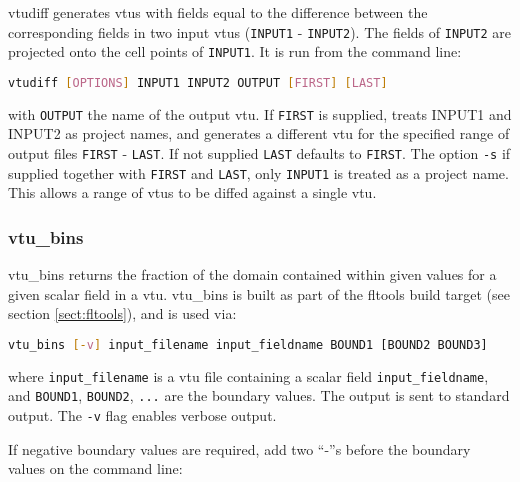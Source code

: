 vtudiff generates vtus with fields equal to the difference between the corresponding fields in two input vtus (\lstinline[language = Bash]+INPUT1+ - \lstinline[language = Bash]+INPUT2+). The fields of \lstinline[language = Bash]+INPUT2+ are projected onto the cell points of \lstinline[language = Bash]+INPUT1+. It is run from the command line:
\begin{lstlisting}[language = Bash]
vtudiff [OPTIONS] INPUT1 INPUT2 OUTPUT [FIRST] [LAST]
\end{lstlisting}
with \lstinline[language = Bash]+OUTPUT+ the name of the output vtu. If \lstinline[language = Bash]+FIRST+ is supplied, treats INPUT1 and INPUT2 as project names, and generates a different vtu for the specified range of output files \lstinline[language = Bash]+FIRST+ - \lstinline[language = Bash]+LAST+. If not supplied \lstinline[language = Bash]+LAST+ defaults to \lstinline[language = Bash]+FIRST+. The option \lstinline[language = Bash]+-s+ if supplied together with \lstinline[language = Bash]+FIRST+ and \lstinline[language = Bash]+LAST+, only \lstinline[language = Bash]+INPUT1+ is treated as a project name. This allows a range of vtus to be diffed against a single vtu.


\subsubsection{vtu\_bins}
\label{sect:vtu_bins}

vtu\_bins returns the fraction of the domain contained within given values
for a given scalar field in a vtu. vtu\_bins is built as part of the fltools
build target (see section \ref{sect:fltools}), and is used via:

\begin{lstlisting}[language = Bash]
vtu_bins [-v] input_filename input_fieldname BOUND1 [BOUND2 BOUND3]
\end{lstlisting}

where \lstinline[language = Bash]+input_filename+ is a vtu file containing a scalar
field \lstinline[language = Bash]+input_fieldname+, and
\lstinline[language = Bash]+BOUND1+, \lstinline[language = Bash]+BOUND2+,
\lstinline[language = Bash]+...+ are the boundary values. The output is sent to
standard output. The \lstinline[language = Bash]+-v+ flag enables verbose output.

If negative boundary values are required, add two ``-''s before the boundary
values on the command line:

